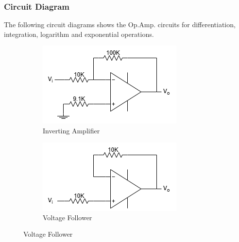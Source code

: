     \subsubsection{Circuit Diagram}
        The following circuit diagrams shows the Op.Amp. circuits for differentiation, integration, logarithm and exponential operations.
        \begin{figure}[H]
            \centering
            \begin{subfigure}{0.4\textwidth}
                \includegraphics[width=1\linewidth]{Experiment_10/Circuit/Lab10a.drawio.png}
                \caption{Inverting Amplifier}
                \label{cir:InvAmp}
            \end{subfigure}
            \begin{subfigure}{0.4\textwidth}
                \includegraphics[width=1\linewidth]{Experiment_10/Circuit/Lab10b.drawio.png}
                \caption{Voltage Follower}
                \label{cir:VolFAmp}
            \end{subfigure}


\end{figure}
